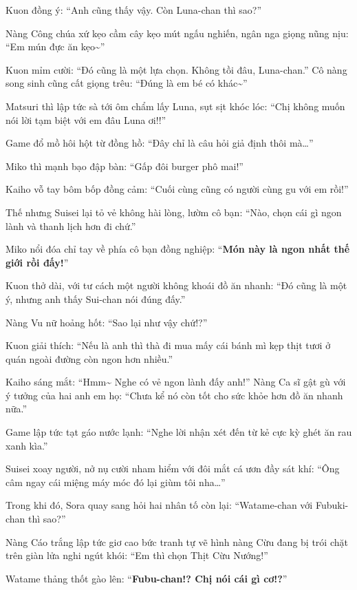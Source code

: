 \documentclass[../main.tex]{subfiles}
\begin{document}
Kuon đồng ý: ``Anh cũng thấy vậy. Còn Luna-chan thì sao?''

Nàng Công chúa xứ kẹo cầm cây kẹo mút ngấu nghiến, ngân nga giọng nũng nịu: ``Em mún đực ăn kẹo\~{}''

Kuon mỉm cười: ``Đó cũng là một lựa chọn. Không tồi đâu, Luna-chan.'' Cô nàng song sinh cũng cất giọng trêu: ``Đúng là em bé có khác\~{}''

Matsuri thì lập tức sà tới ôm chẩm lấy Luna, sụt sịt khóc lóc: ``Chị không muốn nói lời tạm biệt với em đâu Luna ơi!!''


Game đổ mồ hôi hột từ đồng hồ: ``Đây chỉ là câu hỏi giả định thôi mà\dots''

Miko thì mạnh bạo đập bàn: ``Gấp đôi burger phô mai!''

Kaiho vỗ tay bôm bốp đồng cảm: ``Cuối cùng cũng có người cùng gu với em rồi!''

Thế nhưng Suisei lại tỏ vẻ không hài lòng, lườm cô bạn: ``Nào, chọn cái gì ngon lành và thanh lịch hơn đi chứ.''

Miko nổi đóa chỉ tay về phía cô bạn đồng nghiệp: ``\textbf{Món này là ngon nhất thế giới rồi đấy!}''


Kuon thở dài, với tư cách một người không khoái đồ ăn nhanh: ``Đó cũng là một ý, nhưng anh thấy Sui-chan nói đúng đấy.''

Nàng Vu nữ hoảng hốt: ``Sao lại như vậy chứ!?''

Kuon giải thích: ``Nếu là anh thì thà đi mua mấy cái bánh mì kẹp thịt tươi ở quán ngoài đường còn ngon hơn nhiều.''

Kaiho sáng mắt: ``Hmm\~{} Nghe có vẻ ngon lành đấy anh!'' Nàng Ca sĩ gật gù với ý tưởng của hai anh em họ: ``Chưa kể nó còn tốt cho sức khỏe hơn đồ ăn nhanh nữa.''

Game lập tức tạt gáo nước lạnh: ``Nghe lời nhận xét đến từ kẻ cực kỳ ghét ăn rau xanh kìa.''

Suisei xoay người, nở nụ cười nham hiểm với đôi mắt cá ươn đầy sát khí: ``Ông câm ngay cái miệng máy móc đó lại giùm tôi nha\dots''

Trong khi đó, Sora quay sang hỏi hai nhân tố còn lại: ``Watame-chan với Fubuki-chan thì sao?''

Nàng Cáo trắng lập tức giơ cao bức tranh tự vẽ hình nàng Cừu đang bị trói chặt trên giàn lửa nghi ngút khói: ``Em thì chọn Thịt Cừu Nướng!''

Watame thảng thốt gào lên: ``\textbf{Fubu-chan!? Chị nói cái gì cơ!?}''
\end{document}

